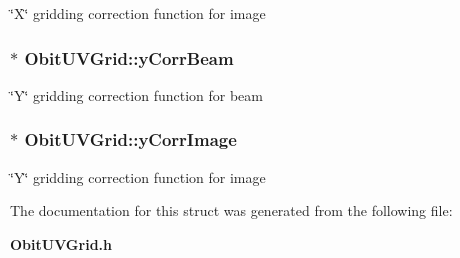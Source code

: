\char`\"{}X\char`\"{} gridding correction function for image 

\subsubsection{$\ast$ {\bf Obit\-UVGrid::y\-Corr\-Beam}}\label{structObitUVGrid_o39}


\char`\"{}Y\char`\"{} gridding correction function for beam 

\subsubsection{$\ast$ {\bf Obit\-UVGrid::y\-Corr\-Image}}\label{structObitUVGrid_o41}


\char`\"{}Y\char`\"{} gridding correction function for image 



The documentation for this struct was generated from the following file:\begin{CompactItemize}
\item 
{\bf Obit\-UVGrid.h}\end{CompactItemize}
